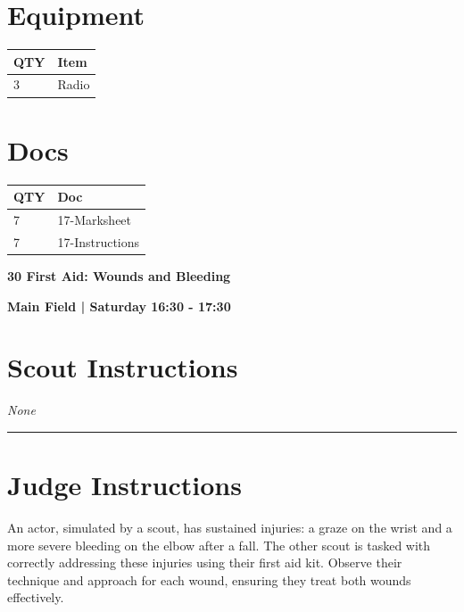 \documentclass[10pt]{article}
\newcommand{\newtitle}[1]{\begin{center}{\Huge\bfseries #1 }\\ \vspace{5mm}\end{center}}
\newcommand{\newsubtitle}[1]{\begin{center}{\color{grey}\Large\bfseries #1 }\\ \vspace{5mm}\end{center}}
\begin{document}
	\begin{multicols}{2}

		\section*{\faWrench \: Equipment}

		
	\begin{center}
			\begin{tabular}{p{2cm}p{4cm}}


				\textbf{QTY} & \textbf{Item} \\\toprule
												3&Radio\\\midrule
								\end{tabular}

			\end{center}

		
		\vfill\null
		\columnbreak

			\section*{\faFile \: Docs}
		 	\begin{center}
			\begin{tabular}{p{2cm}p{4cm}}

			\textbf{QTY} & \textbf{Doc} \\\toprule
										7&17-Marksheet\\\midrule
										7&17-Instructions\\\midrule
							\end{tabular}
			\end{center}
	

		\vfill\null

		\end{multicols}



	\vspace{1cm}


	\clearpage
		\newtitle{30 First Aid: Wounds and Bleeding }
	\newsubtitle{Main Field | Saturday 16:30 - 17:30}
		\setcounter{section}{29}
	\section*{Scout Instructions}
		\textit{None}
	
	\vspace{0.5cm}
	\hrule
	\vspace{0.5cm}

		\section*{Judge Instructions}
		An actor, simulated by a scout, has sustained injuries: a graze on the wrist and a more severe bleeding on the elbow after a fall. The other scout is tasked with correctly addressing these injuries using their first aid kit. Observe their technique and approach for each wound, ensuring they treat both wounds effectively.
\end{document}
